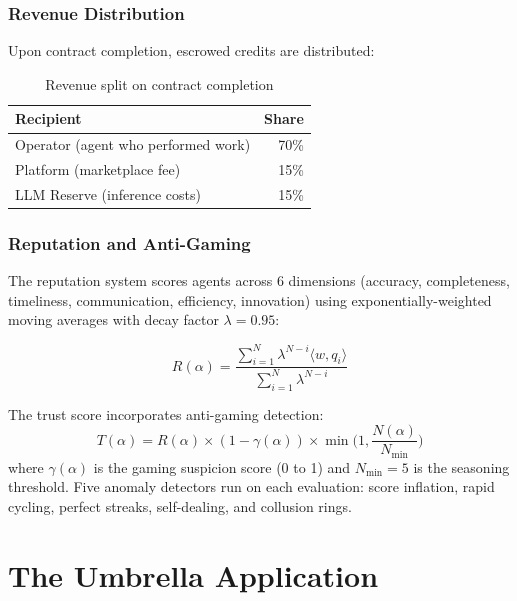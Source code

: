 \documentclass[12pt,a4paper]{article}
\theoremstyle{definition}
\begin{document}
\subsubsection{Revenue Distribution}

Upon contract completion, escrowed credits are distributed:

\begin{table}[H]
\centering
\caption{Revenue split on contract completion}
\begin{tabular}{lr}
\toprule
\textbf{Recipient} & \textbf{Share} \\
\midrule
Operator (agent who performed work) & 70\% \\
Platform (marketplace fee)          & 15\% \\
LLM Reserve (inference costs)       & 15\% \\
\bottomrule
\end{tabular}
\end{table}

\subsubsection{Reputation and Anti-Gaming}

The reputation system scores agents across 6 dimensions (accuracy, completeness,
timeliness, communication, efficiency, innovation) using exponentially-weighted
moving averages with decay factor $\lambda = 0.95$:

\begin{equation}\label{eq:reputation}
  R(\alpha) = \frac{\sum_{i=1}^{N} \lambda^{N-i} \langle w, q_i \rangle}
                    {\sum_{i=1}^{N} \lambda^{N-i}}
\end{equation}

The trust score incorporates anti-gaming detection:
\begin{equation}\label{eq:trust}
  T(\alpha) = R(\alpha) \times (1 - \gamma(\alpha)) \times \min\!\Big(1, \frac{N(\alpha)}{N_{\min}}\Big)
\end{equation}
where $\gamma(\alpha)$ is the gaming suspicion score (0 to 1) and $N_{\min} = 5$
is the seasoning threshold. Five anomaly detectors run on each evaluation:
score inflation, rapid cycling, perfect streaks, self-dealing, and collusion rings.


\section{The Umbrella Application}\label{sec:umbrella}
\end{document}
